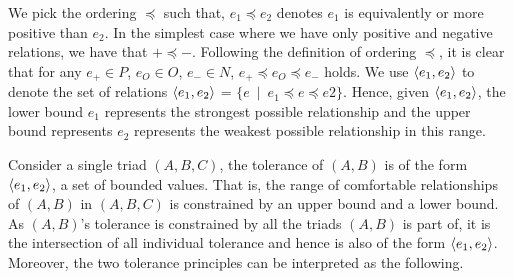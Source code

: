 We pick the ordering $\preceq$
such that, $e_{1} \preceq e_{2}$ denotes $e_{1}$ is equivalently or more positive than $e_{2}$.
In the simplest case where we have only positive and negative relations, we
have that $+ \preceq -$. Following the definition of ordering $\preceq$, it is clear that
for any $e_{+} \in P$, $e_{O} \in O$, $e_{-} \in N$, $e_{+} \preceq
e_{O} \preceq e_{-}$ holds. We use $\langle e_1,e_2\rangle$ to denote the
set of relations $\langle e_1,e_2\rangle$ = $\{e\:\mid\: e_1\preceq e\preceq
e2\}$. Hence, given $\langle e_1,e_2\rangle$, the lower bound $e_1$
represents the strongest possible relationship and the upper bound
represents $e_2$ represents the weakest possible relationship in this
range.
 
Consider a single triad $(A,B,C)$, the tolerance of $(A,B)$ is of the form $\langle e_1,e_2\rangle$, a set of bounded values. That is, the range of comfortable relationships of $(A,B)$ in $(A,B,C)$ is constrained by an upper bound and a lower bound. As $(A,B)$'s tolerance is constrained by all the triads $(A,B)$ is part of, it is the intersection of all individual tolerance and hence is also of the form $\langle e_1,e_2\rangle$. Moreover, the two tolerance principles can be interpreted as the following.
